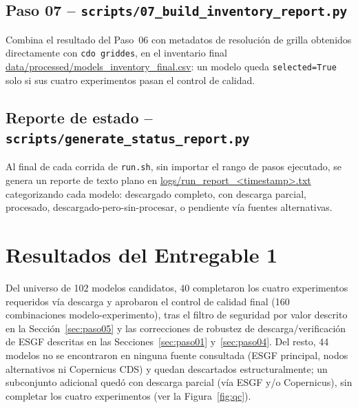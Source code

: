 \documentclass[11pt,a4paper]{article}
\newcommand{\archivo}[1]{\begingroup\hypersetup{urlcolor=black}\url{#1}\endgroup}
\begin{document}
\subsection{Paso 07 -- \texttt{scripts/07\_build\_inventory\_report.py}}
Combina el resultado del Paso~06 con metadatos de resoluci\'on de grilla obtenidos directamente con \texttt{cdo griddes}, en el inventario final \archivo{data/processed/models_inventory_final.csv}: un modelo queda \texttt{selected=True} solo si sus cuatro experimentos pasan el control de calidad.

\subsection{Reporte de estado -- \texttt{scripts/generate\_status\_report.py}}
\label{sec:reporte}
Al final de cada corrida de \texttt{run.sh}, sin importar el rango de pasos ejecutado, se genera un reporte de texto plano en \archivo{logs/run_report_<timestamp>.txt} categorizando cada modelo: descargado completo, con descarga parcial, procesado, descargado-pero-sin-procesar, o pendiente v\'ia fuentes alternativas.

\section{Resultados del Entregable 1}
\label{sec:resultados}

Del universo de 102 modelos candidatos, 40 completaron los cuatro experimentos requeridos v\'ia descarga y aprobaron el control de calidad final (160 combinaciones modelo-experimento), tras el filtro de seguridad por valor descrito en la Secci\'on~\ref{sec:paso05} y las correcciones de robustez de descarga/verificaci\'on de ESGF descritas en las Secciones~\ref{sec:paso01} y~\ref{sec:paso04}. Del resto, 44 modelos no se encontraron en ninguna fuente consultada (ESGF principal, nodos alternativos ni Copernicus CDS) y quedan descartados estructuralmente; un subconjunto adicional qued\'o con descarga parcial (v\'ia ESGF y/o Copernicus), sin completar los cuatro experimentos (ver la Figura~\ref{fig:qc}).
\end{document}
